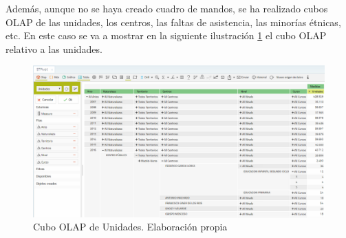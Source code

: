 Además, aunque no se haya creado cuadro de mandos, se ha realizado cubos OLAP de las unidades, los centros, las faltas de asistencia, las minorías étnicas, etc. En este caso se va a mostrar en la siguiente ilustración \ref{fig:STPivotUnidades} el cubo OLAP relativo a las unidades.

\begin{figure}[htb]
	\centering
	\caption{Cubo OLAP de Unidades. Elaboración propia}
	\label{fig:STPivotUnidades}
	\includegraphics[width=1\textwidth]{recursos/STPivotUnidades}
\end{figure}
\FloatBarrier




